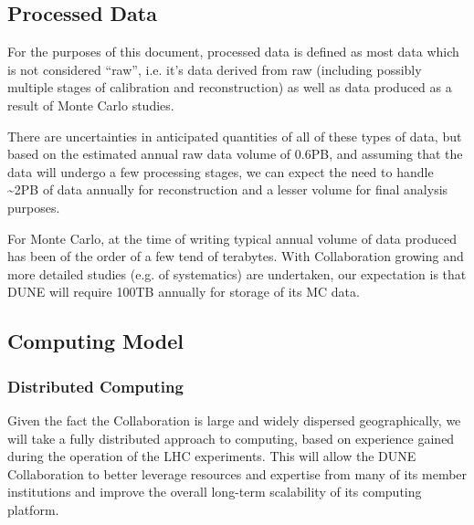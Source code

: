 \subsection{Processed Data}
\label{sec:detectors-sc-infrastructure-processed-data}
For the purposes of this document, processed data is defined as most data which is not considered ``raw'', i.e. it's data derived from raw (including possibly multiple stages
of calibration and reconstruction) as well as data produced as a result of Monte Carlo studies.

There are uncertainties in anticipated quantities of all of these types of data, but based on the estimated annual raw data volume of 0.6PB, and assuming that
the data will undergo a few processing stages, we can expect the need to handle \textasciitilde 2PB of data annually for reconstruction and a lesser
volume for final analysis purposes.

For Monte Carlo, at the time of writing typical annual volume of data produced has been of the order of a few tend of terabytes. With Collaboration growing
and more detailed studies (e.g. of systematics) are undertaken, our expectation is that DUNE will require 100TB annually for storage of its MC data.

\subsection{Computing Model}
\label{sec:detectors-sc-infrastructure-computing-model}

\subsubsection{Distributed Computing}


Given the fact the Collaboration is large and widely dispersed geographically, we will take a fully distributed approach to computing, based on experience
gained during the operation of the LHC experiments. This will allow the DUNE Collaboration to better leverage resources and expertise from many of its
member institutions and improve the overall long-term scalability of its computing platform.

